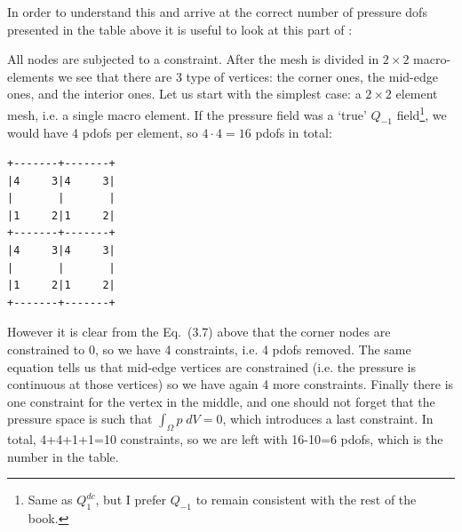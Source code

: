 In order to understand this and arrive at the correct number of pressure dofs
presented in the table above 
it is useful to look at this part of \textcite{huzh11}:

\begin{center}
\end{center}

All nodes are subjected to a constraint. After the mesh is divided 
in $2\times 2$ macro-elements we see that there are 3 type of vertices: the corner ones, 
the mid-edge ones, and the interior ones. 
Let us start with the simplest case: a $2\times 2$ element mesh, i.e. a single macro element.
If the pressure field was a `true' $Q_{-1}$ field\footnote{
Same as $Q_1^{dc}$, but I prefer $Q_{-1}$ to remain consistent 
with the rest of the book.}, we would have 4 pdofs per element,
so $4\cdot 4=16$ pdofs in total:
\begin{verbatim}
+-------+-------+
|4     3|4     3|
|       |       |
|1     2|1     2|
+-------+-------+
|4     3|4     3|
|       |       |
|1     2|1     2|
+-------+-------+
\end{verbatim}
However it is clear from the Eq.~(3.7) above that the corner nodes are constrained to 0, so we
have 4 constraints, i.e. 4 pdofs removed. 
The same equation tells us that mid-edge vertices are constrained (i.e. the pressure 
is continuous at those vertices) so we have again 4 more constraints.
Finally there is one constraint for the vertex in the middle, and one should not 
forget that the pressure space is such that  $\int _\Omega p \; dV=0$, which 
introduces a last constraint. 
In total, 4+4+1+1=10 constraints, so we are left with 16-10=6 pdofs, which is the 
number in the table.

